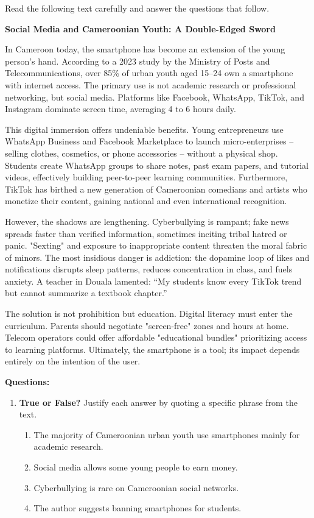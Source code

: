 \documentclass[11pt]{article}
\begin{document}
\begin{exercice}
Read the following text carefully and answer the questions that follow.

\textbf{Social Media and Cameroonian Youth: A Double-Edged Sword}

In Cameroon today, the smartphone has become an extension of the young person's hand. According to a 2023 study by the Ministry of Posts and Telecommunications, over 85\% of urban youth aged 15--24 own a smartphone with internet access. The primary use is not academic research or professional networking, but social media. Platforms like Facebook, WhatsApp, TikTok, and Instagram dominate screen time, averaging 4 to 6 hours daily.

This digital immersion offers undeniable benefits. Young entrepreneurs use WhatsApp Business and Facebook Marketplace to launch micro-enterprises -- selling clothes, cosmetics, or phone accessories -- without a physical shop. Students create WhatsApp groups to share notes, past exam papers, and tutorial videos, effectively building peer-to-peer learning communities. Furthermore, TikTok has birthed a new generation of Cameroonian comedians and artists who monetize their content, gaining national and even international recognition.

However, the shadows are lengthening. Cyberbullying is rampant; fake news spreads faster than verified information, sometimes inciting tribal hatred or panic. "Sexting" and exposure to inappropriate content threaten the moral fabric of minors. The most insidious danger is addiction: the dopamine loop of likes and notifications disrupts sleep patterns, reduces concentration in class, and fuels anxiety. A teacher in Douala lamented: ``My students know every TikTok trend but cannot summarize a textbook chapter.''

The solution is not prohibition but education. Digital literacy must enter the curriculum. Parents should negotiate "screen-free" zones and hours at home. Telecom operators could offer affordable "educational bundles" prioritizing access to learning platforms. Ultimately, the smartphone is a tool; its impact depends entirely on the intention of the user.

\textbf{Questions:}

\begin{enumerate}
\item \textbf{True or False?} Justify each answer by quoting a specific phrase from the text.
\begin{enumerate}
\item The majority of Cameroonian urban youth use smartphones mainly for academic research.
\item Social media allows some young people to earn money.
\item Cyberbullying is rare on Cameroonian social networks.
\item The author suggests banning smartphones for students.
\end{enumerate}


\end{enumerate}
\end{exercice}
\end{document}
